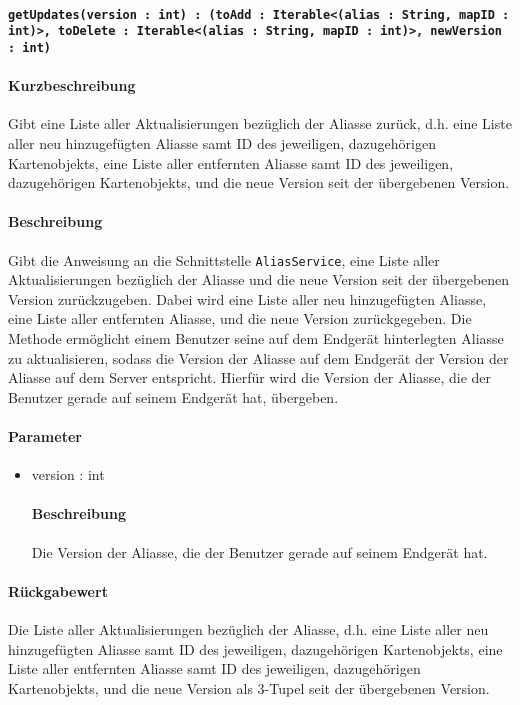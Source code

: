 \paragraph{\texttt{getUpdates(version : int) : (toAdd : Iterable<(alias : String, mapID : int)>, toDelete : Iterable<(alias : String, mapID : int)>, newVersion : int)}}%
\paragraph*{Kurzbeschreibung}
Gibt eine Liste aller Aktualisierungen bezüglich der Aliasse zurück, d.h. eine Liste aller neu hinzugefügten Aliasse samt ID des jeweiligen, dazugehörigen Kartenobjekts, eine Liste aller entfernten Aliasse samt ID des jeweiligen, dazugehörigen Kartenobjekts, und die neue Version seit der übergebenen Version.
\paragraph*{Beschreibung}
Gibt die Anweisung an die Schnittstelle \texttt{AliasService}, eine Liste aller Aktualisierungen bezüglich der Aliasse und die neue Version seit der übergebenen Version zurückzugeben. 
Dabei wird eine Liste aller neu hinzugefügten Aliasse, eine Liste aller entfernten Aliasse, und die neue Version zurückgegeben.
Die Methode ermöglicht einem Benutzer seine auf dem Endgerät hinterlegten Aliasse zu aktualisieren, sodass die Version der Aliasse auf dem Endgerät der Version der Aliasse auf dem Server entspricht.
Hierfür wird die Version der Aliasse, die der Benutzer gerade auf seinem Endgerät hat, übergeben.
\paragraph*{Parameter}
\begin{itemize}
    \item version : int
    		\paragraph*{Beschreibung}
    		Die Version der Aliasse, die der Benutzer gerade auf seinem Endgerät hat.
\end{itemize}
\paragraph*{Rückgabewert}
Die Liste aller Aktualisierungen bezüglich der Aliasse, d.h. eine Liste aller neu hinzugefügten Aliasse samt ID des jeweiligen, dazugehörigen Kartenobjekts, eine Liste aller entfernten Aliasse samt ID des jeweiligen, dazugehörigen Kartenobjekts, und die neue Version als 3-Tupel seit der übergebenen Version.
